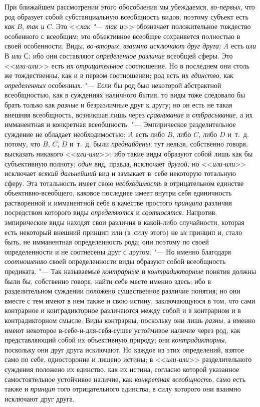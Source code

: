 При ближайшем рассмотрении этого обособления мы убеждаемся,
{\em во-первых}, что род
образует собой субстанциальную всеобщность видов; поэтому субъект есть
{\em как} $B$, {\em так и} $C$. Это <<{\em как "--- так и}>>
обозначает положительное тождество особенного с всеобщим; это
объективное всеобщее сохраняется полностью в своей особенности. Виды,
{\em во-вторых}, {\em взаимно исключают друг друга;} $A$ есть
{\em или} $В$ {\em или} $С$; ибо они составляют {\em определенное
различие} всеобщей сферы. Это <<{\em или-или}>> есть их {\em отрицательное}
соотношение. Но в последнем они столь же тождественны, как и
в первом соотношении; род есть их {\em единство}, как {\em определенных}
особенных. "--- Если бы род был некоторой
абстрактной всеобщностью, как в суждениях наличного бытия, то виды тоже
следовало бы брать только как {\em разные} и
безразличные друг к другу; но он есть не такая внешняя всеобщность,
возникшая лишь через {\em сравнивание} и {\em отбрасывание},
а их имманентная и конкретная всеобщность. "---
Эмпирическое разделительное суждение не обладает
необходимостью: $A$ есть либо $B$, либо $C$, либо $D$ и~т.~д.
потому, что $B$, $C$, $D$ и~т.~д. были {\em преднайдены}: тут
нельзя, собственно говоря, высказать никакого <<{\em или-или}>>; ибо
такие виды образуют собой лишь как бы субъективную полноту;
{\em один} вид, правда, исключает {\em другой;} но <<{\em или-или}>>
исключает {\em всякий дальнейший} вид и замыкает в~себе некоторую
тотальную сферу. Эта тотальность имеет свою {\em необходимость} в
отрицательном единстве объективно-всеобщего, каковое последнее имеет внутри
себя единичность растворенной и имманентной себе в качестве простого
{\em принципа} различия посредством которого виды {\em определяются} и
{\em соотносятся}. Напротив, эмпирические виды находят свои различия в
какой-либо случайности, которая есть некоторый внешний принцип или (в~силу
этого) не {\em их} принцип и, стало быть, не имманентная определенность рода;
они поэтому по своей определенности и не соотнесены друг с другом. "---
Но именно благодаря {\em соотношению} своей
определенности виды образуют собой всеобщность предиката. "--- Так называемые
{\em контрарные} и {\em контрадикторные}
понятия должны были бы, собственно говоря, найти себе место
именно здесь; ибо в разделительном суждении положено существенное различие
понятия; но они вместе с тем имеют в нем также и свою истину, заключающуюся
в том, что сами контрарное и контрадикторное различаются между собой и в
контрарном и в контрадикторном смысле. Виды контрарны, поскольку они лишь
{\em разны}, а именно
имеют некоторое в-себе-и-для-себя-сущее устойчивое наличие через род, как
представляющий собой их объективную природу; они {\em контрадикторны},
поскольку они друг друга исключают. Но каждое из этих
определений, взятое само по себе, односторонне и лишено истины; в
<<{\em или-или}>>
разделительного суждения положено их единство, как их истина,
согласно которой указанное самостоятельное устойчивое наличие, как
{\em конкретная всеобщность}, само есть также и {\em принцип} того
отрицательного единства, в силу которого они взаимно исключают друг друга.

